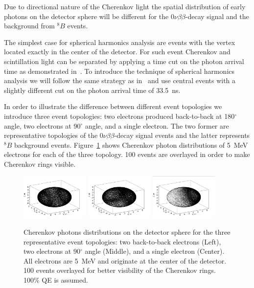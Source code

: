 \documentclass[12pt,twoside,letterpaper]{article}
\newcommand{\vbb}{0\nu\beta\beta}
\newcommand{\B}{^{8}B}
\begin{document}
Due to directional nature of the Cherenkov light the spatial distribution of early photons on the detector sphere will be different for the $\vbb$-decay signal and the background from $\B$ events. 



The simplest case for spherical harmonics analysis are events with the vertex located exactly in the center of the detector. For such event Cherenkov and scintillation light can be separated by applying a time cut on the photon arrival time as demonstrated in~\cite{Directionality}. To introduce the technique of spherical harmonics analysis we will follow the same strategy as in~\cite{Directionality} and use central events with a slightly different cut on the photon arrival time of 33.5~ns.

In order to illustrate the difference between different event topologies we introduce three event topologies: two electrons produced back-to-back at 180$^{\circ}$ angle, two electrons at 90$^{\circ}$ angle, and a single electron. The two former are representative topologies of the $\vbb$-decay signal events and the latter represents $\B$ background events. Figure~\ref{fig:Display_top_5MeV} shows Cherenkov photon distributions of 5~MeV electrons for each of the three topology. 100 events are overlayed in order to make Cherenkov rings visible.

\begin{figure}[htb]
\centering
\includegraphics[angle=0,width=0.3\textwidth]{plots/hDisplay_topology180_5MeV.JPG}
\includegraphics[angle=0,width=0.3\textwidth]{plots/hDisplay_topology90_5MeV.JPG}
\includegraphics[angle=0,width=0.3\textwidth]{plots/hDisplay_1el_5MeV.JPG}
\caption{Cherenkov photons distributions on the detector sphere for the three representative event topologies: two back-to-back electrons (Left), two electrons at 90$^{\circ}$ angle (Middle), and a single electron (Center).  All electrons are 5~MeV and originate at the center of the detector. 100 events overlayed for better visibility of the Cherenkov rings. 100\% QE is assumed.}
\label{fig:Display_top_5MeV}
\end{figure}
\end{document}
